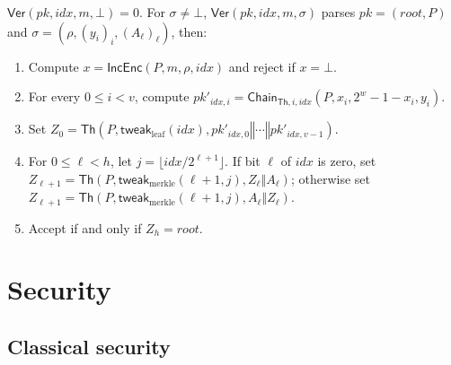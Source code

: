 \documentclass[11pt]{article}
\theoremstyle{definition}
\theoremstyle{plain}
\theoremstyle{remark}
\newcommand{\Th}{\mathsf{Th}}
\newcommand{\IncEnc}{\mathsf{IncEnc}}
\newcommand{\Ver}{\mathsf{Ver}}
\newcommand{\Chain}{\mathsf{Chain}}
\newcommand{\concat}{\mathbin\Vert}
\newcommand{\idx}{\mathit{idx}}
\newcommand{\pk}{\mathit{pk}}
\newcommand{\rootnode}{\mathit{root}}
\begin{document}
$\Ver(\pk,\idx,m,\bot)=0$. For $\sigma\neq\bot$, $\Ver(\pk,\idx,m,\sigma)$ parses $\pk=(\rootnode,P)$ and $\sigma=(\rho,(y_i)_i,(A_\ell)_\ell)$, then:
\begin{enumerate}[leftmargin=2em]
\item Compute $x=\IncEnc(P,m,\rho,\idx)$ and reject if $x=\bot$.
\item For every $0\leq i<v$, compute $\mathit{pk}'_{\idx,i}=\Chain_{\Th,i,\idx}(P,x_i,2^w-1-x_i,y_i)$.
\item Set $Z_0=\Th(P,\mathsf{tweak}_{\mathrm{leaf}}(\idx),\mathit{pk}'_{\idx,0}\concat\cdots\concat\mathit{pk}'_{\idx,v-1})$.
\item For $0\leq\ell<h$, let $j=\lfloor\idx/2^{\ell+1}\rfloor$. If bit $\ell$ of $\idx$ is zero, set $Z_{\ell+1}=\Th(P,\mathsf{tweak}_{\mathrm{merkle}}(\ell+1,j),Z_\ell\concat A_\ell)$; otherwise set $Z_{\ell+1}=\Th(P,\mathsf{tweak}_{\mathrm{merkle}}(\ell+1,j),A_\ell\concat Z_\ell)$.
\item Accept if and only if $Z_h=\rootnode$.
\end{enumerate}

\section{Security}
\label{sec:security}

\subsection{Classical security}
\end{document}
